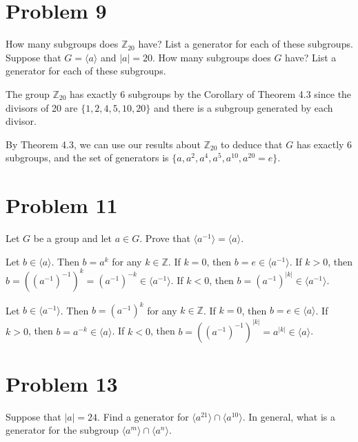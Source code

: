 \documentclass{article}
\begin{document}
\section*{Problem 9}

How many subgroups does $\mathbb{Z}_{20}$ have?  List a generator for each
of these subgroups.  Suppose that $G=\langle a\rangle$ and $|a|=20$.
How many subgroups does $G$ have?  List a generator for each of these subgroups.

The group $\mathbb{Z}_{20}$ has exactly 6 subgroups by the Corollary
of Theorem 4.3 since the divisors of 20 are $\{1,2,4,5,10,20\}$ and
there is a subgroup generated by each divisor.

By Theorem 4.3, we can use our results about $\mathbb{Z}_{20}$ to deduce that
$G$ has exactly 6 subgroups, and the set of generators is $\{a,a^2,a^4,a^5,a^{10},a^{20}=e\}$.

\section*{Problem 11}

Let $G$ be a group and let $a\in G$.  Prove that $\langle a^{-1}\rangle=\langle a\rangle$.

Let $b\in\langle a\rangle$.  Then $b=a^k$ for any $k\in\mathbb{Z}$.
If $k=0$, then $b=e\in\langle a^{-1}\rangle$.  If $k>0$, then
$b=((a^{-1})^{-1})^k=(a^{-1})^{-k}\in\langle a^{-1}\rangle$.
If $k<0$, then $b=(a^{-1})^{|k|}\in\langle a^{-1}\rangle$.

Let $b\in\langle a^{-1}\rangle$.  Then $b=(a^{-1})^k$ for any $k\in\mathbb{Z}$.
If $k=0$, then $b=e\in\langle a\rangle$.  If $k>0$, then
$b=a^{-k}\in\langle a\rangle$.  If $k<0$, then $b=((a^{-1})^{-1})^{|k|}=a^{|k|}\in\langle a\rangle$.

\section*{Problem 13}

Suppose that $|a|=24$.  Find a generator for $\langle a^{21}\rangle\cap\langle a^{10}\rangle$.
In general, what is a generator for the subgroup $\langle a^m\rangle\cap\langle a^n\rangle$.
\end{document}
